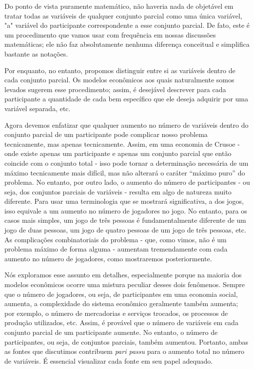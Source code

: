 \documentclass[12pt]{article}
\begin{document}
Do ponto de vista puramente matemático, não haveria nada de objetável em tratar todas as variáveis de qualquer conjunto parcial como uma única variável, "a" variável do participante correspondente a esse conjunto parcial. De fato, este é um procedimento que vamos usar com frequência em nossas discussões matemáticas; ele não faz absolutamente nenhuma diferença conceitual e simplifica bastante as notações.

Por enquanto, no entanto, propomos distinguir entre si as variáveis dentro de cada conjunto parcial. Os modelos econômicos aos quais naturalmente somos levados sugerem esse procedimento; assim, é desejável descrever para cada participante a quantidade de cada bem específico que ele deseja adquirir por uma variável separada, etc.

Agora devemos enfatizar que qualquer aumento no número de variáveis dentro do conjunto parcial de um participante pode complicar nosso problema tecnicamente, mas apenas tecnicamente. Assim, em uma economia de Crusoe - onde existe apenas um participante e apenas um conjunto parcial que então coincide com o conjunto total - isso pode tornar a determinação necessária de um máximo tecnicamente mais difícil, mas não alterará o caráter “máximo puro” do problema. No entanto, por outro lado, o aumento do número de participantes - ou seja, dos conjuntos parciais de variáveis - resulta em algo de natureza muito diferente. Para usar uma terminologia que se mostrará significativa, a dos jogos, isso equivale a um aumento no número de jogadores no jogo. No entanto, para os casos mais simples, um jogo de três pessoas é fundamentalmente diferente de um jogo de duas pessoas, um jogo de quatro pessoas de um jogo de três pessoas, etc. As complicações combinatoriais do problema - que, como vimos, não é um problema máximo de forma alguma - aumentam tremendamente com cada aumento no número de jogadores, como mostraremos posteriormente.

Nós exploramos esse assunto em detalhes, especialmente porque na maioria dos modelos econômicos ocorre uma mistura peculiar desses dois fenômenos. Sempre que o número de jogadores, ou seja, de participantes em uma economia social, aumenta, a complexidade do sistema econômico geralmente também aumenta; por exemplo, o número de mercadorias e serviços trocados, os processos de produção utilizados, etc. Assim, é provável que o número de variáveis em cada conjunto parcial de um participante aumente. No entanto, o número de participantes, ou seja, de conjuntos parciais, também aumentou. Portanto, ambas as fontes que discutimos contribuem \textit{pari passu} para o aumento total no número de variáveis. É essencial visualizar cada fonte em seu papel adequado.
\end{document}
